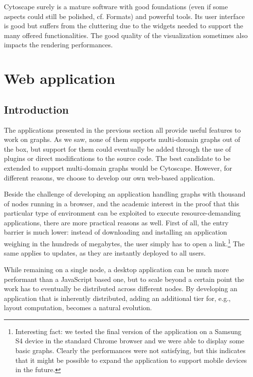 Cytoscape surely is a mature software with good foundations (even if some aspects could still be polished, cf. Formats) and powerful tools. Its user interface is good but suffers from the cluttering due to the widgets needed to support the many offered functionalities. The good quality of the visualization sometimes also impacts the rendering performances.

\section{Web application}

\subsection{Introduction}

The applications presented in the previous section all provide useful features to work on graphs. As we saw, none of them supports multi-domain graphs out of the box, but support for them could eventually be added through the use of plugins or direct modifications to the source code. The best candidate to be extended to support multi-domain graphs would be Cytoscape. However, for different reasons, we choose to develop our own web-based application.

Beside the challenge of developing an application handling graphs with thousand of nodes running in a browser, and the academic interest in the proof that this particular type of environment can be exploited to execute resource-demanding applications, there are more practical reasons as well. First of all, the entry barrier is much lower: instead of downloading and installing an application weighing in the hundreds of megabytes, the user simply has to open a link.\footnote{Interesting fact: we tested the final version of the application on a Samsung S4 device in the standard Chrome browser and we were able to display some basic graphs. Clearly the performances were not satisfying, but this indicates that it might be possible to expand the application to support mobile devices in the future.} The same applies to updates, as they are instantly deployed to all users.

While remaining on a single node, a desktop application can be much more performant than a JavaScript based one, but to scale beyond a certain point the work has to eventually be distributed across different nodes. By developing an application that is inherently distributed, adding an additional tier for, e.g., layout computation, becomes a natural evolution.

